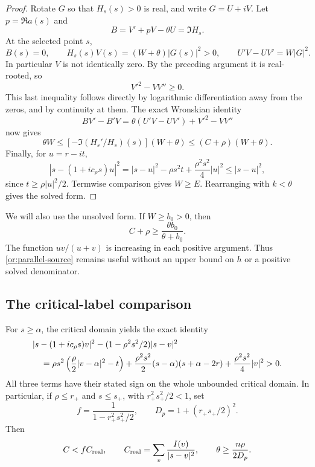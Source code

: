 \begin{proof}
Rotate $G$ so that $H_s(s)>0$ is real, and write $G=U+iV$.  Let
$p=\Re a(s)$ and
\[
                       B=V'+pV-\theta U=\Im H_s.
\]
At the selected point $s$,
\[
 B(s)=0,\qquad H_s(s)V(s)=(W+\theta)|G(s)|^2>0,\qquad
 U'V-UV'=W|G|^2.
\]
In particular $V$ is not identically zero.  By the preceding argument
it is real-rooted, so
\[
 V'^2-VV''\ge0.
\]
This last inequality follows directly by logarithmic differentiation
away from the zeros, and by continuity at them.  The exact Wronskian
identity
\[
 BV'-B'V=\theta(U'V-UV')+V'^2-VV''
\]
now gives
\[
 \theta W\le[-\Im(H_s'/H_s)(s)](W+\theta)
             \le(C+\rho)(W+\theta).
\]
Finally, for $u=r-it$,
\begin{equation}\label{or:denominator-expansion}
 |s-(1+ic_\rho s)u|^2
   =|s-u|^2-\rho s^2t+\frac{\rho^2s^2}{4}|u|^2
   \le |s-u|^2,
\end{equation}
since $t\ge\rho|u|^2/2$.  Termwise comparison gives $W\ge E$.
Rearranging with $k<\theta$ gives the solved form.
\end{proof}

We will also use the unsolved form.  If $W\ge b_0>0$, then
\begin{equation}\label{or:parallel-source}
                   C+\rho\ge\frac{\theta b_0}{\theta+b_0}.
\end{equation}
The function $uv/(u+v)$ is increasing in each positive argument.  Thus
\eqref{or:parallel-source} remains useful without an upper bound on
$h$ or a positive solved denominator.

\subsection{The critical-label comparison}

For $s\ge\alpha$, the critical domain yields the exact identity
\begin{align}
 &|s-(1+ic_\rho s)v|^2
       -(1-\rho^2s^2/2)|s-v|^2\notag\\
 &\quad=\rho s^2\left(\frac\rho2|v-\alpha|^2-t\right)
 +\frac{\rho^2s^2}{2}(s-\alpha)(s+\alpha-2r)
 +\frac{\rho^2s^2}{4}|v|^2>0.\label{or:quadratic-polar}
\end{align}
All three terms have their stated sign on the whole unbounded critical
domain.  In particular, if $\rho\le r_+$ and $s\le s_+$, with
$r_+^2s_+^2/2<1$, set
\begin{equation}\label{or:polar-constants}
 f=\frac1{1-r_+^2s_+^2/2},\qquad
 D_p=1+(r_+s_+/2)^2.
\end{equation}
Then
\[
 C<f C_{\rm real},\qquad
 C_{\rm real}=\sum_v\frac{I(v)}{|s-v|^2},\qquad
 \theta\ge\frac{n\rho}{2D_p}.
\]

